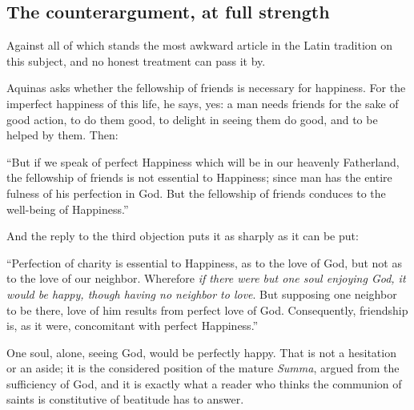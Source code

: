 \subsection{The counterargument, at full strength}

Against all of which stands the most awkward article in the Latin tradition on this subject, and no honest treatment can pass it by.

Aquinas asks whether the fellowship of friends is necessary for happiness. For the imperfect happiness of this life, he says, yes: a man needs friends for the sake of good action, to do them good, to delight in seeing them do good, and to be helped by them. Then:

\begin{studyframe}
``But if we speak of perfect Happiness which will be in our heavenly Fatherland, the fellowship of friends is not essential to Happiness; since man has the entire fulness of his perfection in God. But the fellowship of friends conduces to the well-being of Happiness.''
\end{studyframe}

And the reply to the third objection puts it as sharply as it can be put:

\begin{studyframe}
``Perfection of charity is essential to Happiness, as to the love of God, but not as to the love of our neighbor. Wherefore \emph{if there were but one soul enjoying God, it would be happy, though having no neighbor to love}. But supposing one neighbor to be there, love of him results from perfect love of God. Consequently, friendship is, as it were, concomitant with perfect Happiness.''
\end{studyframe}

One soul, alone, seeing God, would be perfectly happy. That is not a hesitation or an aside; it is the considered position of the mature \emph{Summa}, argued from the sufficiency of God, and it is exactly what a reader who thinks the communion of saints is constitutive of beatitude has to answer.

